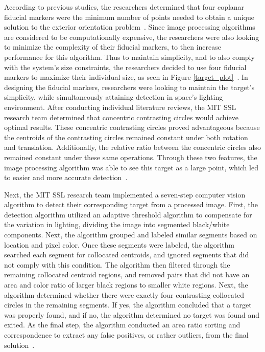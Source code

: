 \documentclass[journal, 10pt]{IEEEtran}
\begin{document}
According to previous studies, the researchers determined that four coplanar fiducial markers were the minimum number of points needed to obtain a unique solution to the exterior orientation problem~\cite{Thesis}. Since image processing algorithms are considered to be computationally expensive, the researchers were also looking to minimize the complexity of their fiducial markers, to then increase performance for this algorithm. Thus to maintain simplicity, and to also comply with the system's size constraints, the researchers decided to use four fiducial markers to maximize their individual size,  as seen in Figure \ref{target_plot}~\cite{Vision, Thesis}. In designing the fiducial markers, researchers were looking to maintain the target's simplicity, while simultaneously attaining detection in space's lighting environment. After conducting individual literature reviews, the MIT SSL research team determined that concentric contrasting circles would achieve optimal results. These concentric contrasting circles proved advantageous because the centroids of the contrasting circles remained constant under both rotation and translation. Additionally, the relative ratio between the concentric circles also remained constant under these same operations. Through these two features,  the image processing algorithm was able to see this target as a large point, which led to easier and more accurate detection~\cite{Vision, Thesis}.

Next, the MIT SSL research team implemented a seven-step computer vision algorithm to detect their corresponding target from a processed image. First, the detection algorithm utilized an adaptive threshold algorithm to compensate for the variation in lighting, dividing the image into segmented black/white components. Next, the algorithm grouped and labeled similar segments based on location and pixel color. Once these segments were labeled, the algorithm searched each segment for collocated centroids, and ignored segments that did not comply with this condition. The algorithm then filtered through the remaining collocated centroid regions, and removed pairs that did not have an area and color ratio of larger black regions to smaller white regions.  Next, the algorithm determined whether there were exactly four contrasting collocated circles in the remaining segments. If yes, the algorithm concluded that a target was properly found, and if no, the algorithm determined no target was found and exited. As the final step, the algorithm conducted an area ratio sorting and correspondence to extract any false positives, or rather outliers, from the final solution~\cite{Vision, Thesis}.
\end{document}
